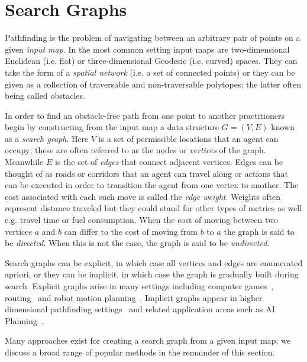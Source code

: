 \section{Search Graphs}
\label{cha::lit::graphs}
Pathfinding is the problem of navigating between an arbitrary pair of points on
a given \emph{input map}.  In the most common setting input maps are
two-dimensional Euclidean (i.e. flat) or three-dimensional Geodesic (i.e. curved) 
spaces. They can take the form of a \emph{spatial network} (i.e. a set of
connected points) or they can be given as a collection of traversable and
non-traversable polytopes; the latter often being called obstacles.

In order to find an obstacle-free path from one point to another practitioners
begin by constructing from the input map a data structure $G = (V, E)$
known as a \emph{search graph}.  Here $V$ is a set of permissible locations that
an agent can occupy; these are often referred to as the nodes or \emph{vertices}
of the graph.  Meanwhile $E$ is the set of \emph{edges} that connect adjacent
vertices.  Edges can be thought of as roads or corridors that an agent can
travel along or actions that can be executed in order to transition the agent
from one vertex to another.
The cost associated with each such move is called the \emph{edge weight}.
Weights often represent distance traveled but they could stand for other types
of metrics as well e.g. travel time or fuel consumption.  When the cost of
moving between two vertices $a$ and $b$ can differ to the cost of moving from $b$ to
$a$ the graph is said to be \emph{directed}.  When this is not the case, the
graph is said to be \emph{undirected}.  

Search graphs can be explicit, in which case all vertices and edges are
enumerated apriori, or they can be implicit, in which case the graph is
gradually built during search. Explicit graphs arise in many settings including
computer games~\citep{davis00,tozour02,champandard09}, 
routing~\citep{sanders05,goldberg06} and robot motion
planning~\citep{latombe91,choset05}.  Implicit graphs appear in higher
dimensional pathfinding settings~\citep{lavalle98,bohlin00} and related
application areas such as AI Planning~\citep{russel03}.  

Many approaches exist for creating a search graph from a given input map; we
discuss a broad range of popular methods in the remainder of this section.

